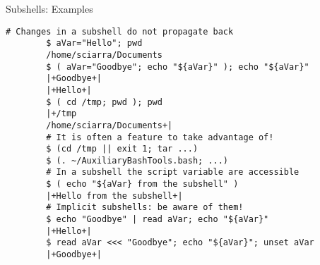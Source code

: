 \begin{frame}[fragile]{Subshells: Examples}
    \begin{lstlisting}[style=MyBash]
        # Changes in a subshell do not propagate back
        $ aVar="Hello"; pwd
        /home/sciarra/Documents
        $ ( aVar="Goodbye"; echo "${aVar}" ); echo "${aVar}"
        |+Goodbye+|
        |+Hello+|
        $ ( cd /tmp; pwd ); pwd
        |+/tmp
        /home/sciarra/Documents+|
        # It is often a feature to take advantage of!
        $ (cd /tmp || exit 1; tar ...)
        $ (. ~/AuxiliaryBashTools.bash; ...)
        # In a subshell the script variable are accessible
        $ ( echo "${aVar} from the subshell" )
        |+Hello from the subshell+|
        # Implicit subshells: be aware of them!
        $ echo "Goodbye" | read aVar; echo "${aVar}"
        |+Hello+|
        $ read aVar <<< "Goodbye"; echo "${aVar}"; unset aVar
        |+Goodbye+|
    \end{lstlisting}
\end{frame}
